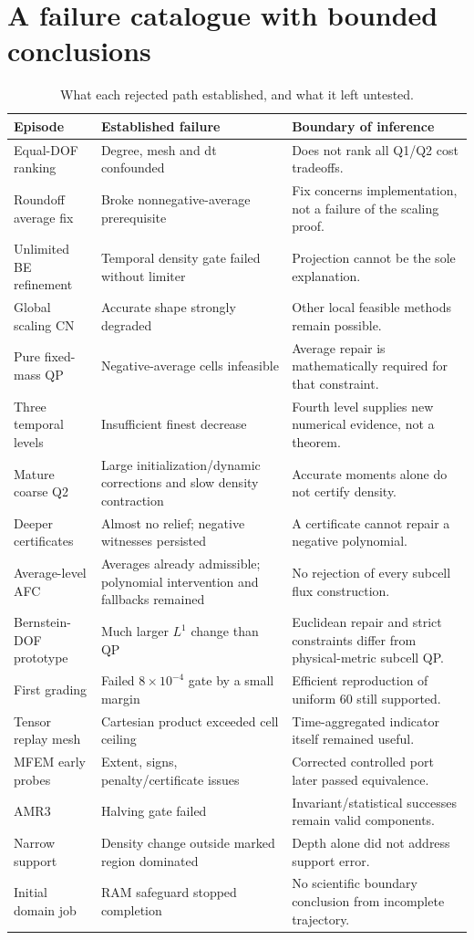 \section{A failure catalogue with bounded conclusions}
\begin{longtable}{p{}p{}p{}}
\caption{What each rejected path established, and what it left untested.}\\
\toprule Episode & Established failure & Boundary of inference\\\midrule\endhead
Equal-DOF ranking & Degree, mesh and dt confounded & Does not rank all Q1/Q2 cost tradeoffs.\\
Roundoff average fix & Broke nonnegative-average prerequisite & Fix concerns implementation, not a failure of the scaling proof.\\
Unlimited BE refinement & Temporal density gate failed without limiter & Projection cannot be the sole explanation.\\
Global scaling CN & Accurate shape strongly degraded & Other local feasible methods remain possible.\\
Pure fixed-mass QP & Negative-average cells infeasible & Average repair is mathematically required for that constraint.\\
Three temporal levels & Insufficient finest decrease & Fourth level supplies new numerical evidence, not a theorem.\\
Mature coarse Q2 & Large initialization/dynamic corrections and slow density contraction & Accurate moments alone do not certify density.\\
Deeper certificates & Almost no relief; negative witnesses persisted & A certificate cannot repair a negative polynomial.\\
Average-level AFC & Averages already admissible; polynomial intervention and fallbacks remained & No rejection of every subcell flux construction.\\
Bernstein-DOF prototype & Much larger $L^1$ change than QP & Euclidean repair and strict constraints differ from physical-metric subcell QP.\\
First grading & Failed $8\times10^{-4}$ gate by a small margin & Efficient reproduction of uniform 60 still supported.\\
Tensor replay mesh & Cartesian product exceeded cell ceiling & Time-aggregated indicator itself remained useful.\\
MFEM early probes & Extent, signs, penalty/certificate issues & Corrected controlled port later passed equivalence.\\
AMR3 & Halving gate failed & Invariant/statistical successes remain valid components.\\
Narrow support & Density change outside marked region dominated & Depth alone did not address support error.\\
Initial domain job & RAM safeguard stopped completion & No scientific boundary conclusion from incomplete trajectory.\\\bottomrule\end{longtable}


